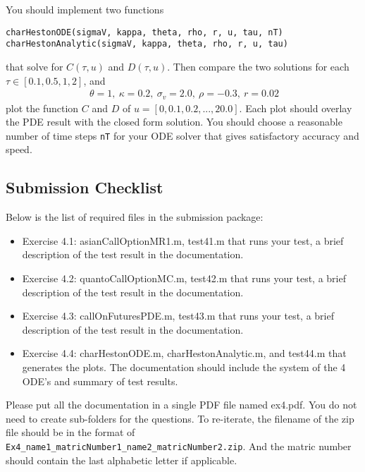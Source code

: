\documentclass[10pt,a4paper,hidelinks,fleqn]{article}            %
\begin{document}
You should implement two functions
\begin{verbatim}
charHestonODE(sigmaV, kappa, theta, rho, r, u, tau, nT)
charHestonAnalytic(sigmaV, kappa, theta, rho, r, u, tau)
\end{verbatim}
that solve for $C(\tau, u)$ and $D(\tau, u)$. 
Then compare the two solutions for each $\tau \in [0.1, 0.5, 1, 2]$, and
\begin{align*}
~\theta = 1, ~\kappa = 0.2, ~\sigma_v = 2.0, ~\rho = -0.3, ~r = 0.02
\end{align*}
plot the function $C$ and $D$ of $u = [0, 0.1, 0.2, ..., 20.0]$. Each plot should overlay the PDE result with the closed form solution.
You should choose a reasonable number of time steps \verb=nT= for your ODE solver that gives satisfactory accuracy and speed.


\subsection*{Submission Checklist}
Below is the list of required files in the submission package:
\begin{itemize}
\item Exercise 4.1: asianCallOptionMR1.m, test41.m that runs your test, a brief description of the test result in the documentation.
\item Exercise 4.2: quantoCallOptionMC.m, test42.m that runs your test, a brief description of the test result in the documentation.
\item Exercise 4.3: callOnFuturesPDE.m, test43.m that runs your test, a brief description of the test result in the documentation.
\item Exercise 4.4: charHestonODE.m, charHestonAnalytic.m, and test44.m that generates the plots. The documentation should include the system of the 4 ODE's and summary of test results.
\end{itemize}
Please put all the documentation in a single PDF file named ex4.pdf.
You do not need to create sub-folders for the questions. 
To re-iterate, the filename of the zip file should be in the format of \verb=Ex4_name1_matricNumber1_name2_matricNumber2.zip=.
And the matric number should contain the last alphabetic letter if applicable. 
\end{document}
